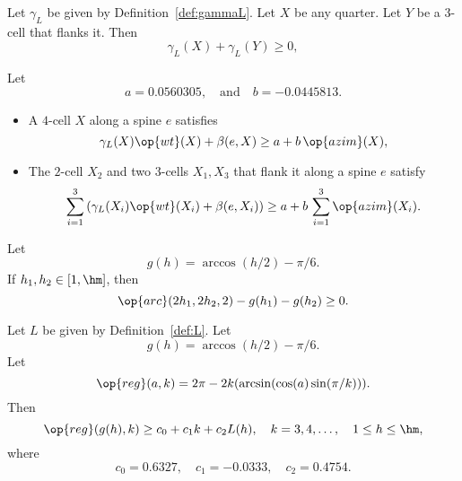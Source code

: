 \begin{calculation}\label{calc:cc:2bl}
Let $\gamma_L$ be given by Definition~\ref{def:gammaL}.  Let $X$ be
any quarter.  Let $Y$ be a $3$-cell that flanks it.  Then
\begin{displaymath}
\gamma_L(X)+\gamma_L(Y)\ge 0,
\end{displaymath}
\end{calculation}

\begin{calculation}\label{calc:cc:5bl}
Let
\begin{displaymath}
a= 0.0560305, \quad\text{and}\quad  b= -0.0445813.
\end{displaymath}
\begin{itemize}
\item {} A $4$-cell $X$ along a spine $e$ satisfies
\begin{displaymath}
\gamma_L(X)\op{wt}(X) + \beta(e,X) \ge a + b\,\op{azim}(X),
\end{displaymath}
\item {} The $2$-cell $X_2$ and two $3$-cells $X_1,X_3$
that flank it along a spine $e$ satisfy
\begin{displaymath}
\sum_{i=1}^3 \left(\gamma_L(X_i)\op{wt}(X_i) + \beta(e,X_i)\right)\ge a + b\,\sum_{i=1}^3\op{azim}(X_i).
\end{displaymath}
\end{itemize}
\end{calculation}

\begin{calculation}\label{calc:cc:disks}
Let
\begin{displaymath}
g(h) = \arccos(h/2) - \pi/6.
\end{displaymath}
If $h_1,h_2\in [1,\hm]$, then
\begin{displaymath}
\op{arc}(2h_1,2h_2,2) - g(h_1) - g(h_2)\ge 0.
\end{displaymath}
\end{calculation}

\begin{calculation}\label{calc:cc:alin}
Let $L$ be given by Definition~\ref{def:L}.
Let
\begin{displaymath}
g(h) = \arccos(h/2) - \pi/6.
\end{displaymath}
Let
\begin{displaymath}
\op{reg}(a,k) = 2\pi - 2 k (\arcsin(\cos(a)\sin(\pi/k))).
\end{displaymath}
Then
\begin{displaymath}
\op{reg}(g(h),k) \ge c_0 + c_1 k + c_2 L(h),\quad
k = 3,4,\ldots,\quad 1\le h\le \hm,
\end{displaymath}
where
\begin{displaymath}c_0 = 0.6327,\quad c_1 = -0.0333,\quad c_2 =
0.4754.\end{displaymath}
\end{calculation}

